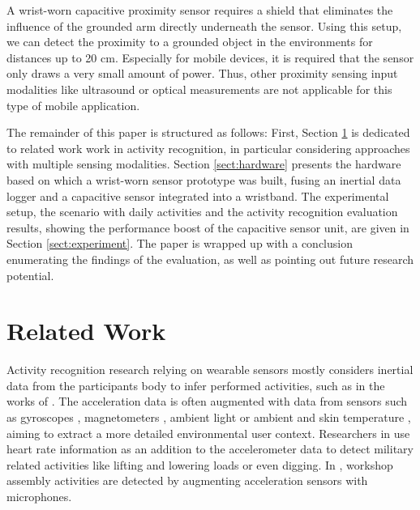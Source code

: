 \documentclass[runningheads,a4paper]{llncs}
\begin{document}
A wrist-worn capacitive proximity sensor requires a shield that eliminates the influence of the grounded arm directly underneath the sensor. Using this setup, we can detect the proximity to a grounded object in the environments for distances up to 20 cm. Especially for mobile devices, it is required that the sensor only draws a very small amount of power. Thus, other proximity sensing input modalities like ultrasound or optical measurements are not applicable for this type of mobile application.


The remainder of this paper is structured as follows: First, Section \ref{sect:related} is dedicated to related work work in activity recognition, in particular considering approaches with multiple sensing modalities. Section \ref{sect:hardware} presents the hardware based on which a wrist-worn sensor prototype was built, fusing an inertial data logger and a capacitive sensor integrated into a wristband. The experimental setup, the scenario with daily activities and the activity recognition evaluation results, showing the performance boost of the capacitive sensor unit, are given in Section \ref{sect:experiment}. The paper is wrapped up with a conclusion enumerating the findings of the evaluation, as well as pointing out future research potential.

\section{Related Work}
\label{sect:related}

Activity recognition research relying on wearable sensors mostly considers inertial data from the participants body to infer performed activities, such as in the works of \cite{Ravi2005,Bao2004,Srinivasan2010,Amft2005}. The acceleration data is often augmented with data from sensors such as gyroscopes \cite{Holleczek_2010}, magnetometers \cite{Altun_2010}, ambient light \cite{Borazio2012} or ambient and skin temperature \cite{Krause_2003}, aiming to extract a more detailed environmental user context. Researchers in \cite{wyss2010recognition} use heart rate information as an addition to the accelerometer data to detect military related activities like lifting and lowering loads or even digging. In \cite{Ward_2006}, workshop assembly activities are detected by augmenting acceleration sensors with microphones.
\end{document}
